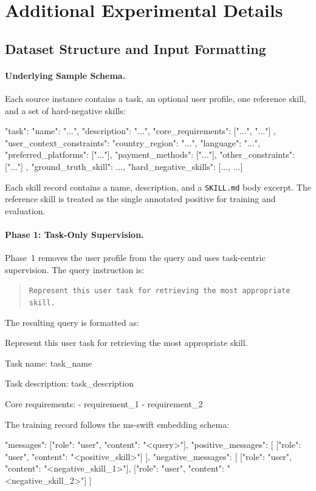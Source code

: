 \documentclass[letterpaper]{article} %
\begin{document}
\section{Additional Experimental Details}
\label{app:experimental_details}

\subsection{Dataset Structure and Input Formatting}
\label{app:dataset_format}

\paragraph{Underlying Sample Schema.}
Each source instance contains a task, an optional user profile, one reference
skill, and a set of hard-negative skills:
\begin{appendixcode}
{
  "task": {
    "name": "...",
    "description": "...",
    "core_requirements": ["...", "..."]
  },
  "user_context_constraints": {
    "country_region": "...",
    "language": "...",
    "preferred_platforms": ["..."],
    "payment_methods": ["..."],
    "other_constraints": ["..."]
  },
  "ground_truth_skill": {...},
  "hard_negative_skills": [{...}, {...}]
}
\end{appendixcode}

Each skill record contains a name, description, and a
\texttt{SKILL.md} body excerpt. The reference skill is treated as the
single annotated positive for training and evaluation.

\paragraph{Phase 1: Task-Only Supervision.}
Phase~1 removes the user profile from the query and uses task-centric
supervision. The query instruction is:
\begin{quote}
\small
\texttt{Represent this user task for retrieving the most appropriate skill.}
\end{quote}
The resulting query is formatted as:
\begin{appendixcode}
Represent this user task for retrieving the most appropriate skill.

Task name: {task_name}

Task description: {task_description}

Core requirements:
- {requirement_1}
- {requirement_2}
\end{appendixcode}
The training record follows the ms-swift embedding schema:
\begin{appendixcode}
{
  "messages": [{"role": "user", "content": "<query>"}],
  "positive_messages": [
    [{"role": "user", "content": "<positive_skill>"}]
  ],
  "negative_messages": [
    [{"role": "user", "content": "<negative_skill_1>"}],
    [{"role": "user", "content": "<negative_skill_2>"}]
  ]
}
\end{appendixcode}
\end{document}
